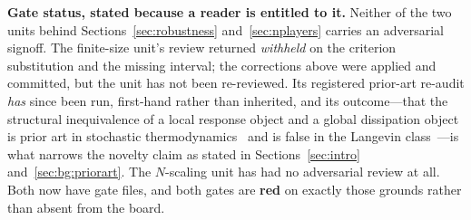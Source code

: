 \noindent\textbf{Gate status, stated because a reader is entitled to it.} Neither of the two
units behind Sections~\ref{sec:robustness} and~\ref{sec:nplayers} carries an adversarial
signoff. The finite-size unit's review returned \emph{withheld} on the criterion
substitution and the missing interval; the corrections above were applied and committed, but
the unit has not been re-reviewed. Its registered prior-art re-audit \emph{has} since been
run, first-hand rather than inherited, and its outcome---that the structural inequivalence of
a local response object and a global dissipation object is prior art in stochastic
thermodynamics~\cite{baiesi2009} and is false in the Langevin class~\cite{haradasasa2005}---is
what narrows the novelty claim as stated in Sections~\ref{sec:intro}
and~\ref{sec:bg:priorart}. The $N$-scaling unit has had no adversarial review at all. Both now have gate files, and both
gates are \textbf{red} on exactly those grounds rather than absent from the board.
